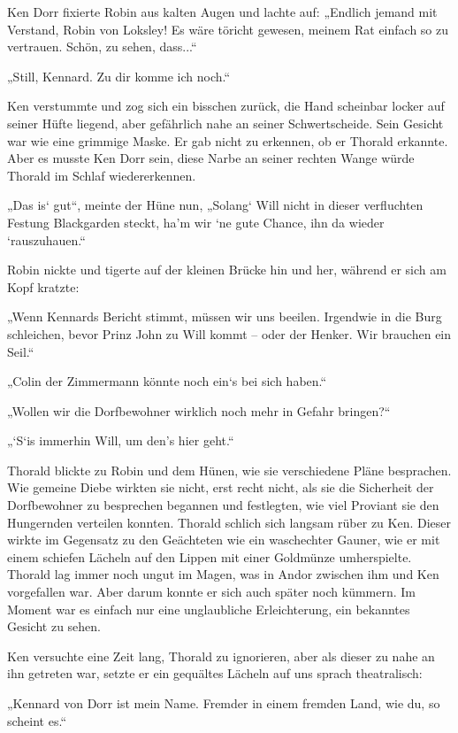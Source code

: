 Ken Dorr fixierte Robin aus kalten Augen und lachte auf: „Endlich jemand mit Verstand, Robin von Loksley! Es wäre töricht gewesen, meinem Rat einfach so zu vertrauen. Schön, zu sehen, dass...“

„Still, Kennard. Zu dir komme ich noch.“

Ken verstummte und zog sich ein bisschen zurück, die Hand scheinbar locker auf seiner Hüfte liegend, aber gefährlich nahe an seiner Schwertscheide. Sein Gesicht war wie eine grimmige Maske. Er gab nicht zu erkennen, ob er Thorald erkannte. Aber es musste Ken Dorr sein, diese Narbe an seiner rechten Wange würde Thorald im Schlaf wiedererkennen.

„Das is‘ gut“, meinte der Hüne nun, „Solang‘ Will nicht in dieser verfluchten Festung Blackgarden steckt, ha’m wir ‘ne gute Chance, ihn da wieder ‘rauszuhauen.“

Robin nickte und tigerte auf der kleinen Brücke hin und her, während er sich am Kopf kratzte:

„Wenn Kennards Bericht stimmt, müssen wir uns beeilen. Irgendwie in die Burg schleichen, bevor Prinz John zu Will kommt – oder der Henker. Wir brauchen ein Seil.“

„Colin der Zimmermann könnte noch ein‘s bei sich haben.“

„Wollen wir die Dorfbewohner wirklich noch mehr in Gefahr bringen?“

„‘S‘is immerhin Will, um den’s hier geht.“

Thorald blickte zu Robin und dem Hünen, wie sie verschiedene Pläne besprachen. Wie gemeine Diebe wirkten sie nicht, erst recht nicht, als sie die Sicherheit der Dorfbewohner zu besprechen begannen und festlegten, wie viel Proviant sie den Hungernden verteilen konnten. Thorald schlich sich langsam rüber zu Ken. Dieser wirkte im Gegensatz zu den Geächteten wie ein waschechter Gauner, wie er mit einem schiefen Lächeln auf den Lippen mit einer Goldmünze umherspielte. Thorald lag immer noch ungut im Magen, was in Andor zwischen ihm und Ken vorgefallen war. Aber darum konnte er sich auch später noch kümmern. Im Moment war es einfach nur eine unglaubliche Erleichterung, ein bekanntes Gesicht zu sehen.

Ken versuchte eine Zeit lang, Thorald zu ignorieren, aber als dieser zu nahe an ihn getreten war, setzte er ein gequältes Lächeln auf uns sprach theatralisch:

„Kennard von Dorr ist mein Name. Fremder in einem fremden Land, wie du, so scheint es.“

